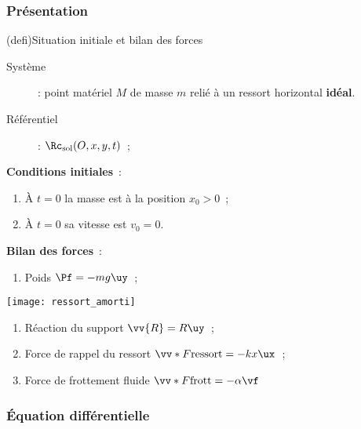 \documentclass[../../main/main.tex]{subfiles}
\begin{document}
\subsubsection{Présentation}
\begin{tcb}[label=def:ressortamorti, sidebyside, righthand ratio=.5](defi){Situation
			initiale et bilan des forces}
	\begin{description}
		\item[Système] : point matériel $M$ de masse $m$ relié à un ressort
			horizontal \textbf{idéal}.
		\item[Référentiel] : $\Rc_{\rm sol} (O,x,y,t)$~;
	\end{description}

	\bigbreak

	\textbf{Conditions initiales}~:
	\begin{enumerate}[leftmargin=20pt]
		\item À $t=0$ la masse est à la position $x_0 > 0$~;
		\item À $t=0$ sa vitesse est $v_0 = 0$.
	\end{enumerate}

	\textbf{Bilan des forces}~:
	\begin{enumerate}
		\item Poids $\Pf = -mg\uy$~;
	\end{enumerate}

	\tcblower
	\begin{center}
		\texttt{[image: ressort\_amorti]}
	\end{center}

	\begin{enumerate}[start=2]
		\item Réaction du support $\vv{R} = R\uy$~;
		\item Force de rappel du ressort $\vv*{F}{\rm ressort} = -kx\ux$~;
		\item Force de frottement fluide $\vv*{F}{\rm frott} = -\alpha\vf$
	\end{enumerate}

\end{tcb}

\subsubsection{Équation différentielle}
\end{document}
